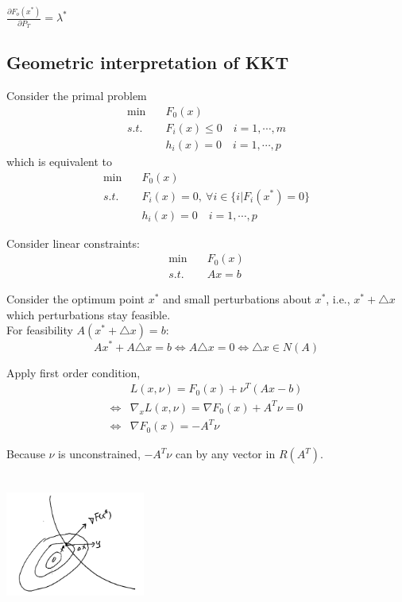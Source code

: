 $\frac{\partial F_o(x^*)}{\partial P_T} = \lambda^*$

\subsection{Geometric interpretation of KKT}
Consider the primal problem
\begin{align*}
\min \quad & F_0(x)\\
s.t. \quad & F_i(x)\leq 0\quad i=1,\cdots,m\\
&h_i(x) = 0\quad i=1,\cdots,p
\end{align*}
which is equivalent to 
\begin{align*}
\min \quad & F_0(x)\\
s.t. \quad & F_i(x)= 0,\ \forall i\in\{i | F_i(x^*)=0\}\\
&h_i(x) = 0\quad i=1,\cdots,p
\end{align*}

Consider linear constraints:
\begin{align*}
\min \quad & F_0(x)\\
s.t. \quad & Ax = b
\end{align*}

Consider the optimum point $x^*$ and small perturbations about $x^*$, i.e., $x^*+\triangle x$ which perturbations stay feasible.\\

For feasibility $A(x^*+\triangle x) = b$:
$$Ax^* + A\triangle x = b\Leftrightarrow A\triangle x = 0\Leftrightarrow \triangle x \in N(A)$$

Apply first order condition,
\begin{align*}
&L(x,\nu) = F_0(x) +\nu^T(Ax-b)\\
\Leftrightarrow & \nabla_xL(x,\nu) = \nabla F_0(x) + A^T\nu  = 0\\
\Leftrightarrow & \nabla F_0(x) = -A^T\nu
\end{align*}

Because $\nu$ is unconstrained, $-A^{T}\nu$ can by any vector in $R(A^T)$.



\begin{marginfigure}
	\centering
	\includegraphics[width=1.8in,height=1.8in]{figures/ch10/figure1204_3.png}
\end{marginfigure}

